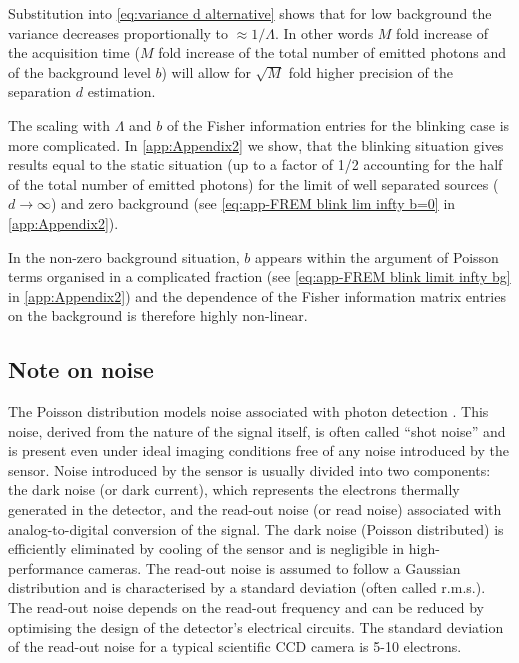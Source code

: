 Substitution into \autoref{eq:variance d alternative} shows that for low background the variance decreases proportionally to $\approx1/\Lambda$. In other words $M$ fold increase of the acquisition time ($M$ fold increase of the total number of emitted photons and of the background level $b$) will allow for $\sqrt{M}$ fold higher precision of the separation $d$ estimation.

The scaling with $\Lambda$ and $b$ of the Fisher information entries for the blinking case is more complicated. In \autoref{app:Appendix2} we show, that the blinking situation gives results equal to the static situation (up to a factor of 1/2 accounting for the half of the total number of emitted photons) for the limit of well separated sources ($d\rightarrow\infty$) and zero background (see \autoref{eq:app-FREM blink lim infty b=0} in \autoref{app:Appendix2}). 

In the non-zero background situation, $b$ appears within the argument of Poisson terms organised in a complicated fraction (see \autoref{eq:app-FREM blink limit infty bg} in \autoref{app:Appendix2}) and the dependence of the Fisher information matrix entries on the background is therefore highly non-linear.  


\subsection{Note on noise}

The Poisson distribution models noise associated with photon detection \cite{PawleyHandbook2006}. This noise, derived from the nature of the signal itself, is often called ``shot noise'' and is present even under ideal imaging conditions free of any noise introduced by the sensor. Noise introduced by the sensor is usually divided into two components: the dark noise (or dark current), which represents the electrons thermally generated in the detector, and the read-out noise (or read noise) associated with analog-to-digital conversion of the signal. The dark noise (Poisson distributed) is efficiently eliminated by cooling of the sensor and is negligible in high-performance cameras.  The read-out noise is assumed to follow a Gaussian distribution and is characterised by a standard deviation (often called r.m.s.).  The read-out noise depends on the read-out frequency and can be reduced by optimising the design of the detector's electrical circuits. The standard deviation of the read-out noise for a typical scientific CCD camera is 5-10 electrons. 

